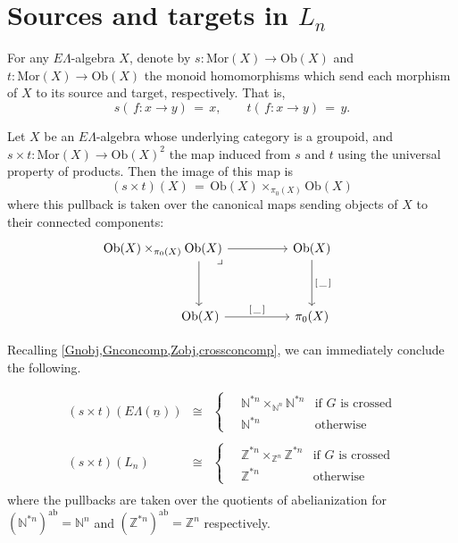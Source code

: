 \documentclass{amsbook} %
\newcommand{\ELn}{E\Lambda(\underline{n})}
\numberwithin{section}{chapter}
\begin{document}
\section{Sources and targets in \texorpdfstring{$L_n$}{L_n}}   

\begin{Defi}\label{st} For any $E\Lambda$-algebra $X$, denote by $s: \mathrm{Mor}(X) \to \mathrm{Ob}(X)$ and $t: \mathrm{Mor}(X) \to \mathrm{Ob}(X)$ the monoid homomorphisms which send each morphism of $X$ to its source and target, respectively. That is,
\[ s( \, f: x \to y) \, = \, x, \quad \quad t( \, f: x \to y) \, = \, y. \]
\end{Defi}


\begin{lem}\label{stmon} Let $X$ be an $E\Lambda$-algebra whose underlying category is a groupoid, and $s \times t: \mathrm{Mor}(X) \to \mathrm{Ob}(X)^2$ the map induced from $s$ and $t$ using the universal property of products. Then the image of this map is
\[ (s \times t)(X) \, = \, \mathrm{Ob}(X) \times_{\pi_0(X)} \mathrm{Ob}(X) \]
where this pullback is taken over the canonical maps sending objects of $X$ to their connected components:
\[ \begin{tikzcd}
\mathrm{Ob}(X) \times_{\pi_0(X)} \mathrm{Ob}(X) \ar[dd, shift left=12] \ar[rr] \ar[ddrr, phantom, "\lrcorner", near start, shift left=4] & & \mathrm{Ob}(X) \ar[dd, "\lbrack \, \_ \, \rbrack"] & \\ 
& & & \\
\quad \quad \quad \quad \quad \quad \mathrm{Ob}(X) \ar[rr, "\lbrack \, \_ \, \rbrack"] & & \pi_0(X)
\end{tikzcd} \]
\end{lem} 


Recalling \cref{Gnobj,Gnconcomp,Zobj,crossconcomp}, we can immediately conclude the following.

\begin{cor} \label{stpullback}
\[\begin{array}{rll} 
		(s \times t)(\ELn) & \cong & \begin{cases}
								\quad \mathbb{N}^{\ast n} \times_{\mathbb{N}^n} \mathbb{N}^{\ast n} & \text{if $G$ is crossed}\\
								\quad \mathbb{N}^{\ast n} & \text{otherwise}
							\end{cases} \\
		& & \\
		(s \times t)(L_n) & \cong & \begin{cases}
								\quad \mathbb{Z}^{\ast n} \times_{\mathbb{Z}^n} \mathbb{Z}^{\ast n}  & \text{if $G$ is crossed}\\
								\quad \mathbb{Z}^{\ast n} & \text{otherwise}
							\end{cases} \\
		\end{array}
\]
where the pullbacks are taken over the quotients of abelianization for $(\mathbb{N}^{\ast n})^{\mathrm{ab}} = \mathbb{N}^n$ and $(\mathbb{Z}^{\ast n})^{\mathrm{ab}} = \mathbb{Z}^n$ respectively.
\end{cor}
\end{document}
